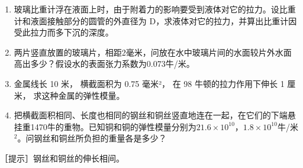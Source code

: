 \begin{enumerate}
\def\labelenumi{\arabic{enumi}.}
\setcounter{enumi}{34}
\item
  玻璃比重计浮在液面上时，由于附着力的影响要受到液体对它的拉力。设比重计和液面接触部分的圆管的外直径为
  D，求液体对它的拉力，并算出比重计因受此拉力而多下沉的深度。
\item
  两片竖直放置的玻璃片，相距2毫米，问放在水中玻璃片间的水面较片外水面高出多少？假设水的表面张力系数为0.073牛/米。
\item
  金属线长 10 米， 横截面积为 0.75 毫米²， 在 98 牛顿的拉力作用下伸长 1
  厘米， 求这种金属的弹性模量。
\item
  把横截面积相同、长度也相同的钢丝和铜丝竖直地连在一起，在它们的下端悬挂重1470牛的重物。已知铜和铜的弹性模量分别为\(21.6 \times 10^{10}\)，\(1.8 \times 10^{10}\)牛/米\(^{2}\)。问钢丝和铜丝所负担的重量各是多少？
\end{enumerate}

［提示］钢丝和铜丝的伸长相间。

